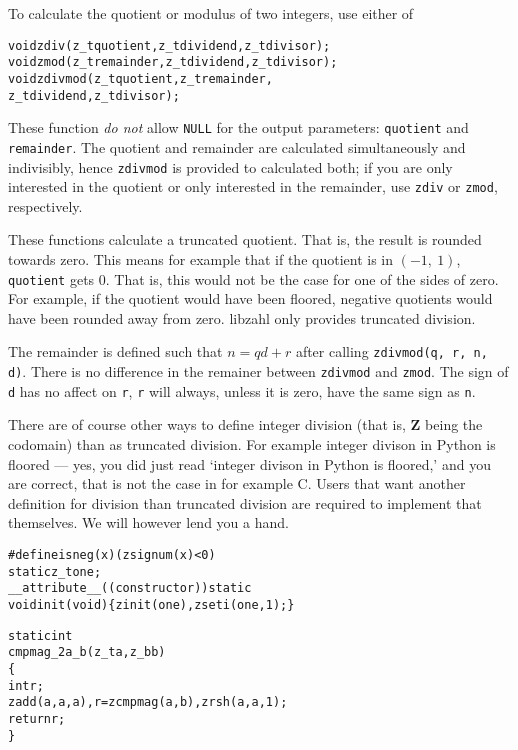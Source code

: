 To calculate the quotient or modulus of two integers,
use either of

\begin{alltt}
   void zdiv(z_t quotient, z_t dividend, z_t divisor);
   void zmod(z_t remainder, z_t dividend, z_t divisor);
   void zdivmod(z_t quotient, z_t remainder,
                z_t dividend, z_t divisor);
\end{alltt}

\noindent
These function \emph{do not} allow {\tt NULL}
for the output parameters: {\tt quotient} and
{\tt remainder}. The quotient and remainder are
calculated simultaneously and indivisibly, hence
{\tt zdivmod} is provided to calculated both; if
you are only interested in the quotient or only
interested in the remainder, use {\tt zdiv} or
{\tt zmod}, respectively.

These functions calculate a truncated quotient.
That is, the result is rounded towards zero. This
means for example that if the quotient is in
$(-1,~1)$, {\tt quotient} gets 0. That is, this %
would not be the case for one of the sides of zero.
For example, if the quotient would have been
floored, negative quotients would have been rounded
away from zero. libzahl only provides truncated
division.

The remainder is defined such that $n = qd + r$ after
calling {\tt zdivmod(q, r, n, d)}. There is no
difference in the remainer between {\tt zdivmod}
and {\tt zmod}. The sign of {\tt d} has no affect
on {\tt r}, {\tt r} will always, unless it is zero,
have the same sign as {\tt n}.

There are of course other ways to define integer
division (that is, \textbf{Z} being the codomain)
than as truncated division. For example integer
divison in Python is floored — yes, you did just
read `integer divison in Python is floored,' and
you are correct, that is not the case in for
example C. Users that want another definition
for division than truncated division are required
to implement that themselves. We will however
lend you a hand.

\begin{alltt}
   #define isneg(x) (zsignum(x) < 0)
   static z_t one;
   \textcolor{c}{__attribute__((constructor)) static}
   void init(void) \{ zinit(one), zseti(one, 1); \}

   static int
   cmpmag_2a_b(z_t a, z_b b)
   \{
       int r;
       zadd(a, a, a), r = zcmpmag(a, b), zrsh(a, a, 1);
       return r;
   \}
\end{alltt}

